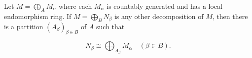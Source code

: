 Let $M = \bigoplus_{A} M_{\alpha}$ where each $M_{\alpha}$ is countably generated and has a local endomorphism ring. If $M = \bigoplus_{B} N_{\beta}$ is any other decomposition of $M$, then there is a partition $(A_{\beta})_{\beta \in B}$ of $A$ such that

$$N_{\beta} \cong \bigoplus_{A_{\beta}} M_{\alpha} \quad (\beta \in B).$$
